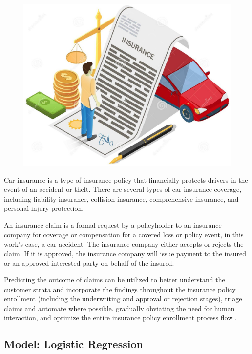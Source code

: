 \documentclass{article}
\begin{document}
\begin{figure}
\includegraphics[width=0.9\linewidth]{./figures/carinsurance.png}
\end{figure}

Car insurance is a type of insurance policy that financially protects
drivers in the event of an accident or theft. There are several types of
car insurance coverage, including liability insurance, collision
insurance, comprehensive insurance, and personal injury protection.

An insurance claim is a formal request by a policyholder to an insurance
company for coverage or compensation for a covered loss or policy event,
in this work's case, a car accident. The insurance company either
accepts or rejects the claim. If it is approved, the insurance company
will issue payment to the insured or an approved interested party on
behalf of the insured.

Predicting the outcome of claims can be utilized to better understand
the customer strata and incorporate the findings throughout the
insurance policy enrollment (including the underwriting and approval or
rejection stages), triage claims and automate where possible, gradually
obviating the need for human interaction, and optimize the entire
insurance policy enrollment process flow \cite{claim}.

\hypertarget{model-logistic-regression}{%
\subsection{\texorpdfstring{Model: Logistic Regression
\label{subsec:model-logit}}{Model: Logistic Regression }}\label{model-logistic-regression}}
\end{document}
